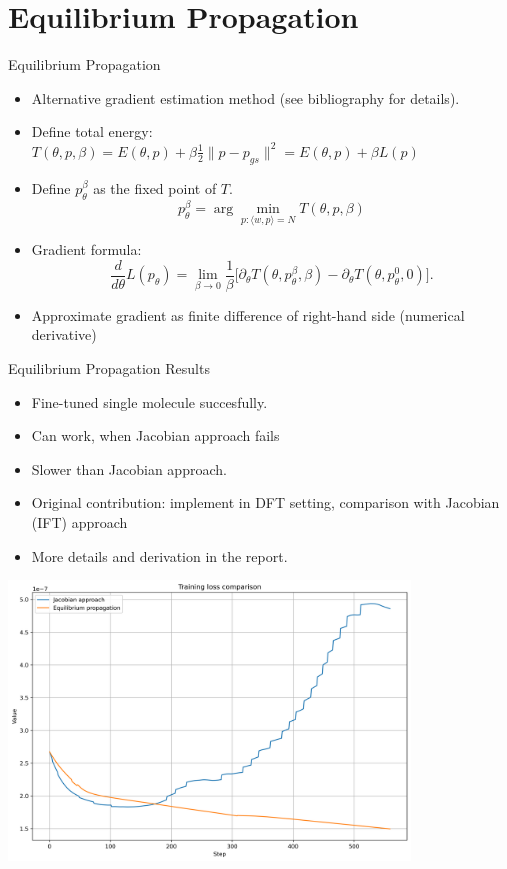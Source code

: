 \documentclass{beamer}
\begin{document}
\section{Equilibrium Propagation}
\begin{frame}{Equilibrium Propagation}
  \begin{itemize}
    \item Alternative gradient estimation method (see bibliography for details).
    \item Define total energy: $T(\theta, p, \beta) = E(\theta, p) + \beta \frac{1}{2}\|p-p_{gs}\|^2 = E(\theta, p) + \beta L(p)$
    \item Define $p_{\theta}^{\beta}$ as the fixed point of $T$.
    \[
      p_{\theta}^{\beta} = \arg\min_{p:\langle w,p \rangle = N} T(\theta, p, \beta)
    \]
    \item Gradient formula:
    \[
      \frac{d}{d\theta} L(p_{\theta}) = \lim_{\beta \to 0} \frac{1}{\beta} \Big[ \partial_{\theta}T(\theta, p^{\beta}_{\theta}, \beta) - \partial_{\theta}T(\theta, p^{0}_{\theta}, 0) \Big].
    \]
    \item Approximate gradient as finite difference of right-hand side (numerical derivative)
  \end{itemize}
\end{frame}

\begin{frame}{Equilibrium Propagation Results}
  \begin{itemize}
    \item Fine-tuned single molecule succesfully.
    \item Can work, when Jacobian approach fails
    \item Slower than Jacobian approach.
    \item Original contribution: implement in DFT setting, comparison with Jacobian (IFT) approach
    \item More details and derivation in the report.
  \end{itemize}

\end{frame}

\begin{frame}

 \begin{center}
    \includegraphics[width=0.8\textwidth]{images/loss_comparison.png} %
  \end{center}
\end{frame}
\end{document}

